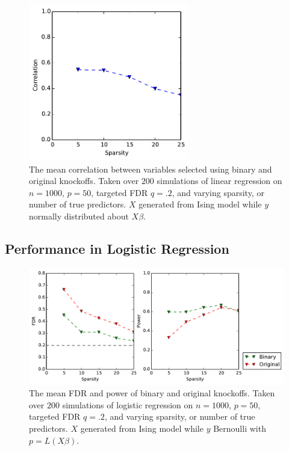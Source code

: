 \documentclass[11pt]{article}
\theoremstyle{definition}
\begin{document}
    \begin{figure}[h]
        \begin{center}
        \includegraphics[width=7cm]{images/lasso_corr_50}
    \end{center}
    \caption{The mean correlation between variables selected using binary and original knockoffs. Taken over $200$ simulations of linear regression on $n=1000$, $p=50$, targeted FDR $q=.2$, and varying sparsity, or number of true predictors. $X$ generated from Ising model while $y$ normally distributed about $X\beta$.}  
    \end{figure}

    \FloatBarrier
\subsection{Performance in Logistic Regression} 
    \FloatBarrier
    \begin{figure}[h]
        \begin{center}
        \includegraphics[width=14cm]{images/logit_FDR_power_50}
    \end{center}
    \caption{The mean FDR and power of binary and original knockoffs. Taken over $200$ simulations of logistic regression on $n=1000$, $p=50$, targeted FDR $q=.2$, and varying sparsity, or number of true predictors. $X$ generated from Ising model while $y$ Bernoulli with $p=L(X\beta)$.}  
    \end{figure}
\end{document}
